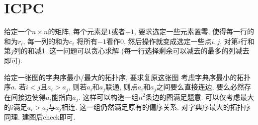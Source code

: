 \section{ICPC}

\prob 给定一个$n\times n$的矩阵, 每个元素是$1$或者$-1$, 要求选定一些元素置零, 使得每一行的和为$r_i$, 每一列的和为$c_i$
\sol 将所有$-1$看作$0$, 然后操作就变成选定一些点$i,j$, 对第$i$行和第$j$列的和减1. 这一问题可以贪心求解 (每一行选择剩余可以减去的最多的列减去即可).

\prob 给定一张图的字典序最小/最大的拓扑序, 要求复原这张图
\sol 考虑字典序最小的拓扑序$a$. 若$i < j$且$a_i > a_j$, 则若$a_i$和$a_j$联通, 则点$a_i$和$a_j$之间要么直接连边, 要么必然存在间接边使得$a_i$能指向$a_j$. 这样可以构造一组$n^2$条边的图满足题意. 可以仅考虑最大的$i$满足$a_i > a_j$与$a_j$相连. 这一组仍然满足原有的偏序关系. 对字典序最大的拓扑序同理. 建图后check即可.